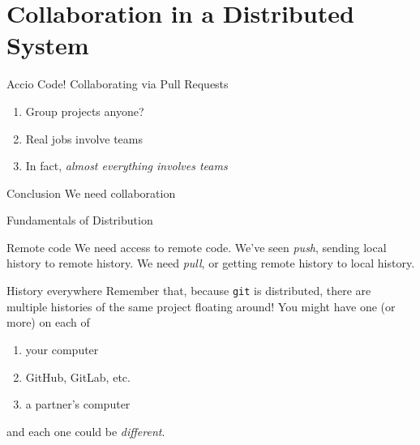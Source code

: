 \documentclass{beamer}
\theoremstyle{example}
\begin{document}
\section{Collaboration in a Distributed System}
\begin{frame}{Accio Code! Collaborating via Pull Requests}
    \begin{enumerate}
        \item Group projects anyone?
        \item Real jobs involve teams
        \item In fact, \emph{almost everything involves teams}
    \end{enumerate}

    \begin{block}{Conclusion}
        We need collaboration
    \end{block}
\end{frame}

\begin{frame}{Fundamentals of Distribution}
    \begin{block}{Remote code}
        We need access to remote code. We've seen \emph{push}, sending local
        history to remote history. We need \emph{pull}, or getting remote
        history to local history.
    \end{block}

    {\pause}

    \begin{block}{History everywhere}
        Remember that, because \texttt{git} is distributed, there are multiple
        histories of the same project floating around! You might have one (or
        more) on each of
        \begin{enumerate}
            \item your computer
            \item GitHub, GitLab, etc.
            \item a partner's computer
        \end{enumerate}
        and each one could be \emph{different}.
    \end{block}
\end{frame}
\end{document}

